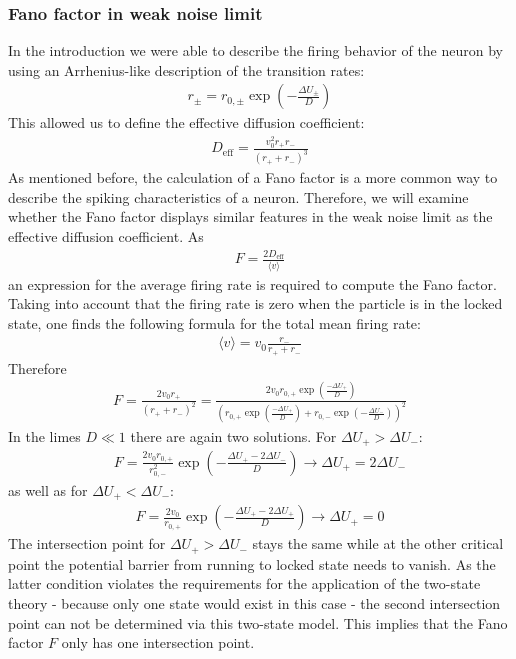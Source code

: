 \documentclass[12pt,a4paper]{article}
\begin{document}
\subsubsection{Fano factor in weak noise limit}
In the introduction we were able to describe the firing behavior of the neuron by using an Arrhenius-like description of the transition rates:
\begin{align*}
r_{\pm}=r_{0,\pm}\exp\left(-\frac{\Delta U_{\pm}}{D}\right)
\end{align*}
This allowed us to define the effective diffusion coefficient:
\begin{align*}
D_{\text{eff}}=\frac{v_0^2 r_+r_-}{(r_++r_-)^3}
\end{align*}
As mentioned before, the calculation of a Fano factor is a more common way to describe the spiking characteristics of a neuron. Therefore, we will examine whether the Fano factor displays similar features in the weak noise limit as the effective diffusion coefficient. As 
\begin{align*}
F=\frac{2D_{\text{eff}}}{\langle v\rangle}
\end{align*}
an expression for the average firing rate is required to compute the Fano factor. Taking into account that the firing rate is zero when the particle is in the locked state, one finds the following formula for the total mean firing rate:
\begin{align*}
\langle v\rangle=v_0\frac{r_-}{r_++r_-}
\end{align*}
Therefore
\begin{align*}
F=\frac{2v_0r_+}{(r_++r_-)^2}=\frac{2v_0r_{0,+}\exp\left(\frac{-\Delta U_+}{D}\right)}{\left(r_{0,+}\exp\left(\frac{-\Delta U_+}{D}\right)+r_{0,-}\exp\left(-\frac{\Delta U_-}{D}\right)\right)^2}
\end{align*}
In the limes $D\ll1$ there are again two solutions. For $\Delta U_+ > \Delta U_-$:
\begin{align*}
F=\frac{2v_0r_{0,+}}{r_{0,-}^2}\exp\left(-\frac{\Delta U_+-2\Delta U_-}{D}\right) \rightarrow \Delta U_+=2\Delta U_-
\end{align*}
as well as for $\Delta U_+ < \Delta U_-$:
\begin{align*}
F=\frac{2v_0}{r_{0,+}}\exp\left(-\frac{\Delta U_+-2\Delta U_+}{D}\right) \rightarrow \Delta U_+=0
\end{align*}
The intersection point for $\Delta U_+ > \Delta U_-$ stays the same while at the other critical point the potential barrier from running to locked state needs to vanish. As the latter condition violates the requirements for the application of the two-state theory - because only one state would exist in this case - the second intersection point can not be determined via this two-state model. This implies that the Fano factor $F$ only has one intersection point.
\end{document}
